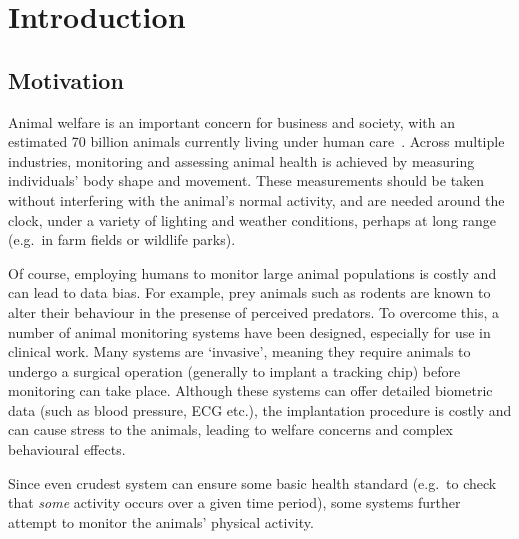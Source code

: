 
\chapter{Introduction}  %

\ifpdf
    \graphicspath{{Chapter1/Figs/Raster/}{Chapter1/Figs/PDF/}{Chapter1/Figs/}}
\else
    \graphicspath{{Chapter1/Figs/Vector/}{Chapter1/Figs/}}
\fi


\section{Motivation} %

Animal welfare is an important concern for business and society, with an estimated 70 billion animals currently living under human care~\cite{FAOSTAT}. Across multiple industries, monitoring and assessing animal health is achieved by measuring individuals' body shape and movement. These measurements should be taken without interfering with the animal's normal activity, and are needed around the clock, under a variety of lighting and weather conditions, perhaps at long range (e.g.\ in farm fields or wildlife parks). 

Of course, employing humans to monitor large animal populations is costly and can lead to data bias. For example, prey animals such as rodents are known to alter their behaviour in the presense of perceived predators. To overcome this, a number of animal monitoring systems have been designed, especially for use in clinical work. Many systems are `invasive', meaning they require animals to undergo a surgical operation (generally to implant a tracking chip) before monitoring can take place. Although these systems can offer detailed biometric data (such as blood pressure, ECG etc.), the implantation procedure is costly and can cause stress to the animals, leading to welfare concerns and complex behavioural effects. 

Since even crudest system can ensure some basic health standard (e.g.\ to check that \emph{some} activity occurs over a given time period), some systems further attempt to monitor the animals' physical activity. 

